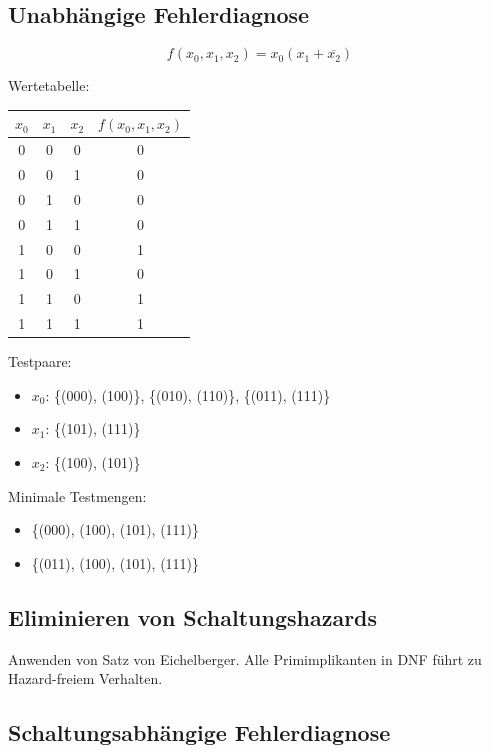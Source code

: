 \documentclass[a4paper,6pt]{article}
\begin{document}
\begin{multicols*}{3}
\subsection*{Unabhängige Fehlerdiagnose}
\[ f(x_0, x_1, x_2) = x_0(x_1 + \overline{x_2}) \]

\scriptsize
Wertetabelle:

\tiny
\begin{center}
    \begin{tabular}{ccc|c}
        \hline
        $x_0$ & $x_1$ & $x_2$ & $f(x_0, x_1, x_2)$ \\
        \hline
        0 & 0 & 0 & 0 \\
        0 & 0 & 1 & 0 \\
        0 & 1 & 0 & 0 \\
        0 & 1 & 1 & 0 \\
        1 & 0 & 0 & 1 \\
        1 & 0 & 1 & 0 \\
        1 & 1 & 0 & 1 \\
        1 & 1 & 1 & 1 \\
        \hline
    \end{tabular}
\end{center}


\scriptsize

Testpaare:

\begin{itemize}
    \item $x_0$: \{(000), (100)\}, \{(010), (110)\}, \{(011), (111)\}
    \item $x_1$: \{(101), (111)\}
    \item $x_2$: \{(100), (101)\}
\end{itemize}

Minimale Testmengen:

\begin{itemize}
    \item \{(000), (100), (101), (111)\}
    \item \{(011), (100), (101), (111)\}
\end{itemize}

\subsection*{Eliminieren von Schaltungshazards}

Anwenden von Satz von Eichelberger. Alle Primimplikanten in DNF führt zu Hazard-freiem Verhalten.

\subsection*{Schaltungsabhängige Fehlerdiagnose}


\end{multicols*}
\end{document}
